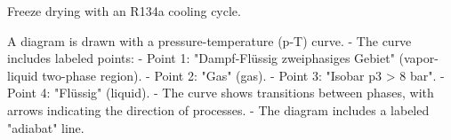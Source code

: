 Freeze drying with an R134a cooling cycle.  

A diagram is drawn with a pressure-temperature (p-T) curve.  
- The curve includes labeled points:  
  - Point 1: "Dampf-Flüssig zweiphasiges Gebiet" (vapor-liquid two-phase region).  
  - Point 2: "Gas" (gas).  
  - Point 3: "Isobar p3 > 8 bar".  
  - Point 4: "Flüssig" (liquid).  
- The curve shows transitions between phases, with arrows indicating the direction of processes.  
- The diagram includes a labeled "adiabat" line.